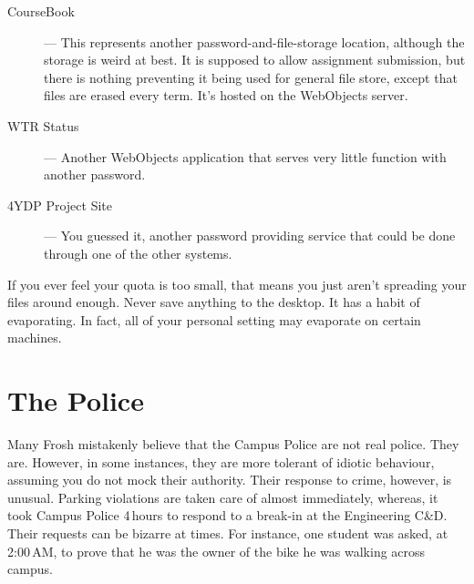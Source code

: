 \documentclass{book}
\begin{document}
\begin{description}
\item[CourseBook] --- This represents another password-and-file-storage location, although the storage is weird at best. It is supposed to allow assignment submission, but there is nothing preventing it being used for general file store, except that files are erased every term. It's hosted on the WebObjects server.
\item[WTR Status] --- Another WebObjects application that serves very little function with another password.
\item[4YDP Project Site] --- You guessed it, another password providing service that could be done through one of the other systems.
\end{description}

If you ever feel your quota is too small, that means you just aren't spreading your files around enough. Never save anything to the desktop. It has a habit of evaporating. In fact, all of your personal setting may evaporate on certain machines.



\section{The Police}
Many Frosh mistakenly believe that the Campus Police are not real police. They are. However, in some instances, they are more tolerant of idiotic behaviour, assuming you do not mock their authority. Their response to crime, however, is unusual. Parking violations are taken care of almost immediately, whereas, it took Campus Police 4\,hours to respond to a break-in at the Engineering C\&D. Their requests can be bizarre at times. For instance, one student was asked, at 2:00\,AM, to prove that he was the owner of the bike he was walking across campus.  
\end{document}
